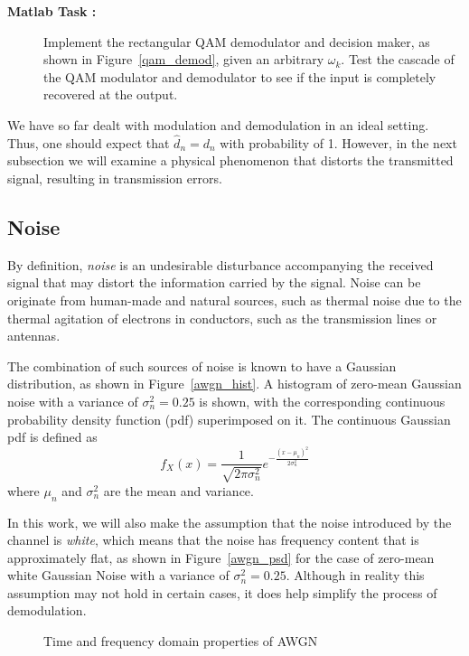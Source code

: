 \documentclass[12pt]{article}
\newcommand{\goodgap}{%
\hspace{\subfigtopskip}%
\hspace{\subfigbottomskip}}
\newcounter{matlabcnt}
\begin{document}
\begin{description}
    \item[{\bf Matlab Task :}]
    Implement the rectangular QAM demodulator and decision maker,
    as shown in Figure~\ref{qam_demod}, given an arbitrary
    $\omega_k$. Test the cascade of the QAM modulator and
    demodulator to see if the input is completely recovered at the
    output.
\end{description}


We have so far dealt with modulation and demodulation in an ideal
setting. Thus, one should expect that $\hat{d}_n=d_n$ with
probability of 1. However, in the next subsection we will examine
a physical phenomenon that distorts the transmitted signal,
resulting in transmission errors.


\subsection{Noise}\label{noisesubsection}

By definition, {\it noise} is an undesirable disturbance
accompanying the received signal that may distort the information
carried by the signal. Noise can be originate from human-made and
natural sources, such as thermal noise due to the thermal
agitation of electrons in conductors, such as the transmission
lines or antennas.

The combination of such sources of noise is known to have a
Gaussian distribution, as shown in Figure~\ref{awgn_hist}. A
histogram of zero-mean Gaussian noise with a variance of
$\sigma_n^2=0.25$ is shown, with the corresponding continuous
probability density function (pdf) superimposed on it. The
continuous Gaussian pdf is defined as
\begin{equation}\label{gaussian_pdf}
f_X(x)=\frac{1}{\sqrt{2\pi\sigma_n^2}}e^{-\frac{(x-\mu_n)^2}{2\sigma_n^2}}
\end{equation}
where $\mu_n$ and $\sigma_n^2$ are the mean and variance.

In this work, we will also make the assumption that the noise
introduced by the channel is {\it white}, which means that the
noise has frequency content that is approximately flat, as shown
in Figure~\ref{awgn_psd} for the case of zero-mean white Gaussian
Noise with a variance of $\sigma_n^2=0.25$. Although in reality
this assumption may not hold in certain cases, it does help
simplify the process of demodulation.
\begin{figure}[t]
\begin{center}
\goodgap
{}
\caption{Time and frequency domain properties of AWGN}
\end{center}
\end{figure}
\end{document}
